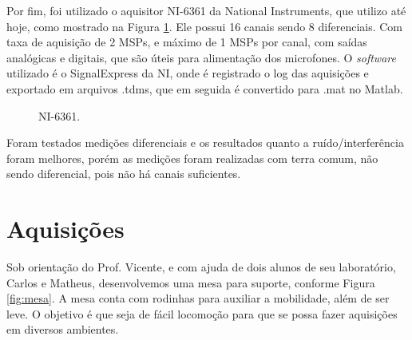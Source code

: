 \documentclass[a4paper,oneside,12pt]{article}
\begin{document}
Por fim, foi utilizado o aquisitor NI-6361 da National Instruments, que utilizo até hoje, como mostrado na Figura \ref{fig:NI}. Ele possui 16 canais sendo 8 diferenciais. Com taxa de aquisição de 2 MSPs, e máximo de 1  MSPs por canal, com saídas analógicas e digitais, que são úteis para alimentação dos microfones. O \emph{software} utilizado é o SignalExpress da NI, onde é registrado o log das aquisições e exportado em arquivos .tdms, que em seguida é convertido para .mat no Matlab.

\begin{figure}
\centering
{}
\caption{NI-6361.}\label{fig:NI}
\end{figure}

Foram testados medições diferenciais e os resultados quanto a ruído/interferência foram melhores, porém as medições foram realizadas com terra comum, não sendo diferencial, pois não há canais suficientes.

\section{Aquisições}

Sob orientação do Prof. Vicente, e com ajuda de dois alunos de seu laboratório, Carlos e Matheus, desenvolvemos uma mesa para suporte, conforme Figura \ref{fig:mesa}. A mesa conta com rodinhas para auxiliar a mobilidade, além de ser leve. O objetivo é que seja de fácil locomoção para que se possa fazer aquisições em diversos ambientes.
\end{document}
